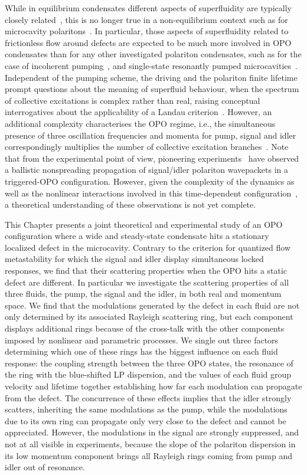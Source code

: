 While in equilibrium condensates different aspects of superfluidity
are typically closely related~\cite{Leggett_1999}, this is no longer
true in a non-equilibrium context such as for microcavity
polaritons~\cite{Carusotto_2013}.
%
In particular, those aspects of superfluidity related to 
frictionless flow around defects are expected to be much more involved
in OPO condensates than for any other investigated polariton
condensates, such as for the case of incoherent
pumping~\cite{Kasprzak_2006,Wouters_2010}, and single-state
resonantly pumped microcavities~\cite{Amo_2009}.
%
Independent of the pumping scheme, the driving and the polariton
finite lifetime prompt questions about the meaning of superfluid
behaviour, when the spectrum of collective excitations is complex
rather than real, raising conceptual interrogatives about the
applicability of a Landau criterion~\cite{Wouters_2010}.
%
However, an additional complexity characterises the OPO regime, i.e., the
simultaneous presence of three oscillation frequencies and momenta for
pump, signal and idler correspondingly multiplies the number of
collective excitation branches~\cite{Wouters_2007}.
%
Note that from the experimental point of view, pioneering
experiments~\cite{Amo_2009_b} have observed a ballistic nonspreading
propagation of signal/idler polariton wavepackets in a triggered-OPO
configuration.
%
However, given the complexity of the dynamics as well as the nonlinear
interactions involved in this time-dependent
configuration~\cite{Szyma_ska_2010}, a theoretical understanding of these
observations is not yet complete.

This Chapter presents a joint theoretical and experimental study of an
OPO configuration where a wide and steady-state condensate hits a
stationary localized defect in the microcavity.
%
Contrary to the criterion for quantized flow metastability for which the
signal and idler display simultaneous locked responses, we find that
their scattering properties when the OPO hits a static defect are
different.
%
In particular we investigate the scattering properties of all three
fluids, the pump, the signal and the idler, in both real and momentum space. We
find that the modulations generated by the defect in each fluid are
not only determined by its associated Rayleigh scattering ring, but
each component displays additional rings because of the cross-talk
with the other components imposed by nonlinear and parametric
processes.
%
We single out three factors determining which one of these rings
has the biggest influence on each fluid response: the coupling strength between
the three OPO states, the resonance of the ring with the blue-shifted
LP dispersion, and the values of each fluid group velocity
and lifetime together establishing how far each modulation can
propagate from the defect.
%
The concurrence of these effects implies that the idler strongly
scatters, inheriting the same modulations as the pump, while the
modulations due to its own ring can propagate only very close to the
defect and cannot be appreciated. However, the modulations in the signal
are strongly suppressed, and not at all visible in experiments,
because the slope of the polariton dispersion in its low momentum
component brings all Rayleigh rings coming from pump and idler out of
resonance.


